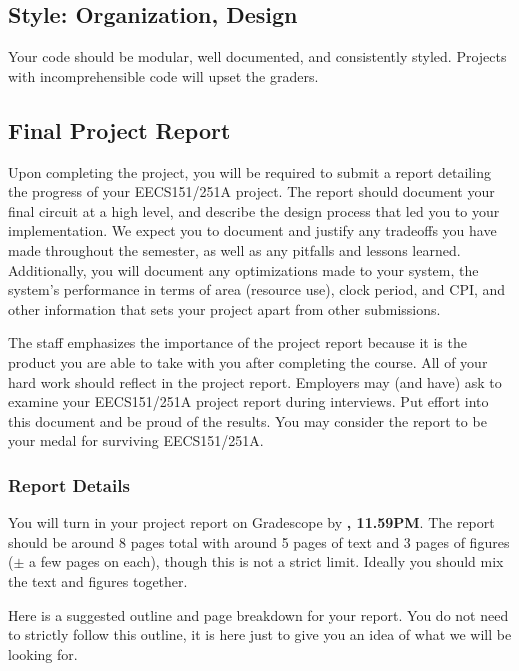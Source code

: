 \documentclass[11pt]{article}
\begin{document}
\subsection{Style: Organization, Design}
\label{style}
Your code should be modular, well documented, and consistently styled.
Projects with incomprehensible code will upset the graders.

\subsection{Final Project Report}
Upon completing the project, you will be required to submit a report detailing the progress of your EECS151/251A project.
The report should document your final circuit at a high level, and describe the design process that led you to your implementation.
We expect you to document and justify any tradeoffs you have made throughout the semester, as well as any pitfalls and lessons learned.
Additionally, you will document any optimizations made to your system, the system's performance in terms of area (resource use), clock period, and CPI, and other information that sets your project apart from other submissions.

The staff emphasizes the importance of the project report because it is the product you are able to take with you after completing the course.
All of your hard work should reflect in the project report.
Employers may (and have) ask to examine your EECS151/251A project report during interviews.
Put effort into this document and be proud of the results.
You may consider the report to be your medal for surviving EECS151/251A.

\subsubsection{Report Details}
You will turn in your project report on Gradescope by \textbf{\finalReportDueDate, 11.59PM}.
The report should be around 8 pages total with around 5 pages of text and 3 pages of figures ($\pm$ a few pages on each), though this is not a strict limit.
Ideally you should mix the text and figures together.

Here is a suggested outline and page breakdown for your report.
You do not need to strictly follow this outline, it is here just to give you an idea of what we will be looking for.
\end{document}
